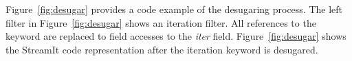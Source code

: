 Figure~\ref{fig:desugar} provides a code example of the desugaring
process.  The left filter in Figure~\ref{fig:desugar} shows an
iteration filter.  All references to the keyword are replaced to field
accesses to the {\it iter} field.  Figure~\ref{fig:desugar} shows the
StreamIt code representation after the iteration keyword is desugared.


